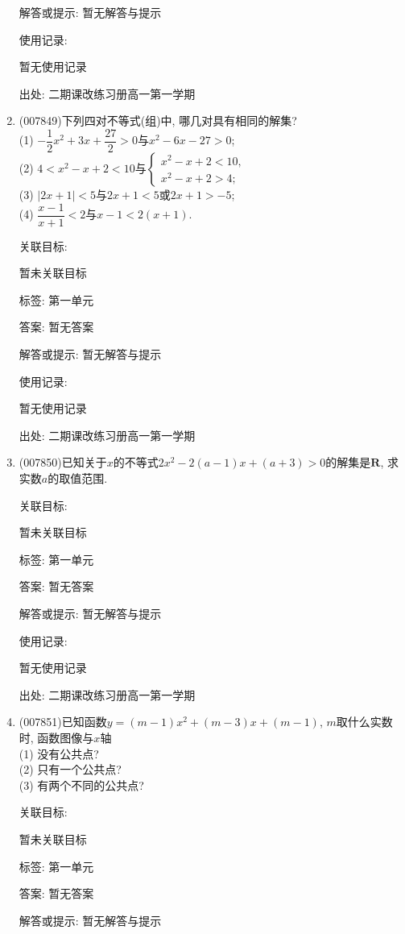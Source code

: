 \documentclass[10pt,a4paper]{article}
\begin{document}
\begin{enumerate}[1.]
解答或提示: 暂无解答与提示

使用记录:

暂无使用记录


出处: 二期课改练习册高一第一学期
\item { (007849)}下列四对不等式(组)中, 哪几对具有相同的解集?\\
(1) $-\dfrac 12x^2+3x+\dfrac{27}2>0$与$x^2-6x-27>0$;\\
(2) $4<x^2-x+2<10$与$\begin{cases} x^2-x+2<10, \\ x^2-x+2>4; \end{cases}$\\
(3) $|2x+1|<5$与$2x+1<5$或$2x+1>-5$;\\
(4) $\dfrac{x-1}{x+1}<2$与$x-1<2(x+1)$.


关联目标:

暂未关联目标



标签: 第一单元

答案: 暂无答案

解答或提示: 暂无解答与提示

使用记录:

暂无使用记录


出处: 二期课改练习册高一第一学期
\item { (007850)}已知关于$x$的不等式$2x^2-2(a-1)x+(a+3)>0$的解集是$\mathbf{R}$, 求实数$a$的取值范围.


关联目标:

暂未关联目标



标签: 第一单元

答案: 暂无答案

解答或提示: 暂无解答与提示

使用记录:

暂无使用记录


出处: 二期课改练习册高一第一学期
\item { (007851)}已知函数$y=(m-1)x^2+(m-3)x+(m-1)$, $m$取什么实数时, 函数图像与$x$轴\\
(1) 没有公共点?\\
(2) 只有一个公共点?\\
(3) 有两个不同的公共点?


关联目标:

暂未关联目标



标签: 第一单元

答案: 暂无答案

解答或提示: 暂无解答与提示


\end{enumerate}
\end{document}
